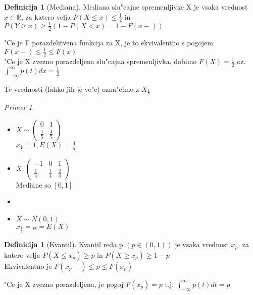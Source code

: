 \documentclass[a4paper,12pt]{article}
\theoremstyle{definition}
\newtheorem{defn}[counter]{Definicija}
\theoremstyle{remark}
\newtheorem*{ex}{Primer}
\newcommand{\R}{\mathbb{R}}
\begin{document}
\begin{defn}[Mediana]
    Mediana slu"cajne spremenljivke X je vsaka vrednost $x \in \R$, za katero velja $P(X \leq x) \leq \frac{1}{2}$
    in $P(Y \geq x) \geq \frac{1}{2} (1-P(X < x) = 1 - F(x-))$
\end{defn}

"Ce je F porazdelitvena funkcija za X, je to ekvivalentno s pogojem $F(x-) \leq \frac{1}{2} \leq F(x)$ \\
"Ce je X zvezno porazdeljena slu"cajna spremenljivka, dobimo $F(X) = \frac{1}{2}$ oz.
$\int_{-\infty}^{\infty} p(t) dx = \frac{1}{2}$     %




Te vrednosti (lahko jih je ve"c) ozna"cimo z $X_{\frac{1}{2}}$

\begin{ex} \text{} \\
    \begin{itemize}
        \item
            $X \sim \begin{pmatrix}0 & 1 \\ \frac{1}{5} & \frac{4}{5} \end{pmatrix}$ \\
            $x_{\frac{1}{2}} = 1, E(X) = \frac{4}{5}$
        \item $X: \begin{pmatrix}-1 & 0 & 1 \\ \frac{1}{4} & \frac{1}{4} & \frac{2}{4} \end{pmatrix}$ \\
            Mediane so $[0,1]$
        \item %
        \item $X \sim N(0,1)$ \\
            $x_{\frac{1}{2}} = \mu = E(X)$
    \end{itemize}
\end{ex}

\begin{defn}[Kvantil]
    Kvantil reda p $(p \in (0,1))$ je vsaka vrednost $x_p$, za katero velja $P(X \leq x_p) \geq p$ in $P(X \geq x_p) \geq 1-p$ \\
    Ekvivalentno je $F(x_p-) \leq p \leq F(x_p)$
\end{defn}

"Ce je X zvezno porazdeljena, je pogoj $F(x_p) = p$ t.j. $\int_{-\infty}^{\infty} p(t) dt = p$
\end{document}
